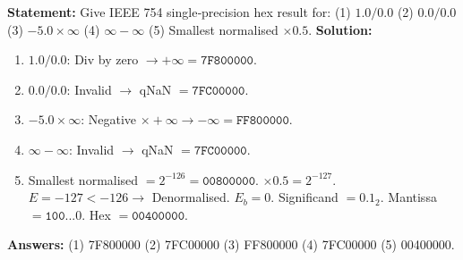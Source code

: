 \documentclass[11pt]{article}
\begin{document}
\begin{exoresolu}
\textbf{Statement:} Give IEEE 754 single‑precision hex result for:
(1) $1.0 / 0.0$ \quad (2) $0.0 / 0.0$ \quad (3) $-5.0 \times \infty$ \quad (4) $\infty - \infty$ \quad (5) Smallest normalised $\times 0.5$.
\tcblower
\textbf{Solution:}
\begin{enumerate}
    \item $1.0 / 0.0$: Div by zero $\to +\infty = \mathtt{7F800000}$.
    \item $0.0 / 0.0$: Invalid $\to$ qNaN $= \mathtt{7FC00000}$.
    \item $-5.0 \times \infty$: Negative $\times +\infty \to -\infty = \mathtt{FF800000}$.
    \item $\infty - \infty$: Invalid $\to$ qNaN $= \mathtt{7FC00000}$.
    \item Smallest normalised $= 2^{-126} = \mathtt{00800000}$. $\times 0.5 = 2^{-127}$.
        $E = -127 < -126 \to$ Denormalised. $E_b=0$. Significand $= 0.1_2$.
        Mantissa $= \mathtt{100...0}$. Hex $= \mathtt{00400000}$.
\end{enumerate}
\textbf{Answers:} (1) 7F800000 (2) 7FC00000 (3) FF800000 (4) 7FC00000 (5) 00400000.
\end{exoresolu}
\end{document}
